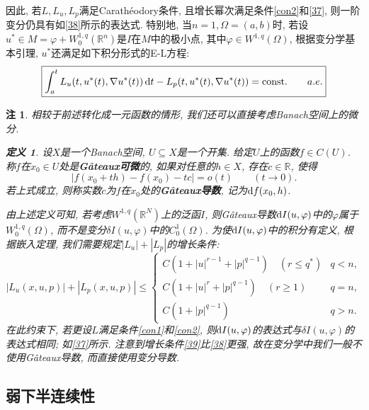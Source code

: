 \documentclass[12pt,a4paper]{article}
\newtheorem{definition}[theorem]{定义}
\newtheorem{remark}[theorem]{注}
\begin{document}
因此, 若$L, L_u, L_p$满足Carathéodory条件, 且增长幂次满足条件\ref{con2}和\eqref{37}, 则一阶变分仍具有如\eqref{38}所示的表达式.
特别地, 当$n = 1, \Omega = (a, b)$时, 若设$u^* \in M = \varphi + W_0^{1, q}(\mathbb{R}^n)$是$I$在$M$中的极小点, 其中$\varphi \in W^{1, q}(\Omega)$, 根据变分学基本引理, $u^*$还满足如下积分形式的E-L方程:
\begin{equation*}
    \boxed{\int_a^tL_u(t, u^*(t), \nabla u^*(t)) \,{\rm d}t - L_p(t, u^*(t), \nabla u^*(t)) = {\rm const.} \qquad a.e.}
\end{equation*}

\begin{remark}
    相较于前述转化成一元函数的情形, 我们还可以直接考虑Banach空间上的微分.
    \begin{definition}
        设$X$是一个Banach空间, $U \subseteq X$是一个开集. 给定$U$上的函数$f \in C(U)$.
        称$f$在$x_0 \in U$处是\textbf{G\^ateaux可微}的, 如果对任意的$h \in X$, 存在$c \in \mathbb{R}$, 使得 
        \begin{equation*}
            |f(x_0 + th) - f(x_0) - tc| = o(t) \qquad (t \rightarrow 0).
        \end{equation*}
        若上式成立, 则称实数$c$为$f$在$x_0$处的\textbf{G\^ateaux导数}, 记为${\rm d}f(x_0, h)$.
    \end{definition}
    由上述定义可知, 若考虑$W^{1, q}(\mathbb{R}^N)$上的泛函$I$, 则G\^ateaux导数${\rm d}I(u, \varphi)$中的$\varphi$属于$W_0^{1, q}(\Omega)$, 而不是变分$\delta I(u, \varphi)$中的$C_0^1(\Omega)$.
    为使${\rm d}I(u, \varphi)$中的积分有定义, 根据嵌入定理, 我们需要规定$|L_u| + |L_p|$的增长条件:
    \begin{equation}\label{39}
        |L_u(x, u, p)| + |L_p(x, u, p)| \leq 
        \begin{cases}
            C(1 + |u|^{r - 1} + |p|^{q - 1}) \quad (r \leq q^*) &q < n, \\ 
            C(1 + |u|^r + |p|^{q - 1}) \quad (r \geq 1) &q = n, \\ 
            C(1 + |p|^{q - 1}) \quad &q > n.
        \end{cases}
    \end{equation}
    在此约束下, 若更设$L$满足条件\ref{con1}和\ref{con2}, 则${\rm d}I(u, \varphi)$的表达式与$\delta I(u, \varphi)$的表达式相同; 如\eqref{37}所示.
    注意到增长条件\eqref{39}比\eqref{38}更强, 故在变分学中我们一般不使用G\^ateaux导数, 而直接使用变分导数.
\end{remark}

\subsection{弱下半连续性}
\end{document}
